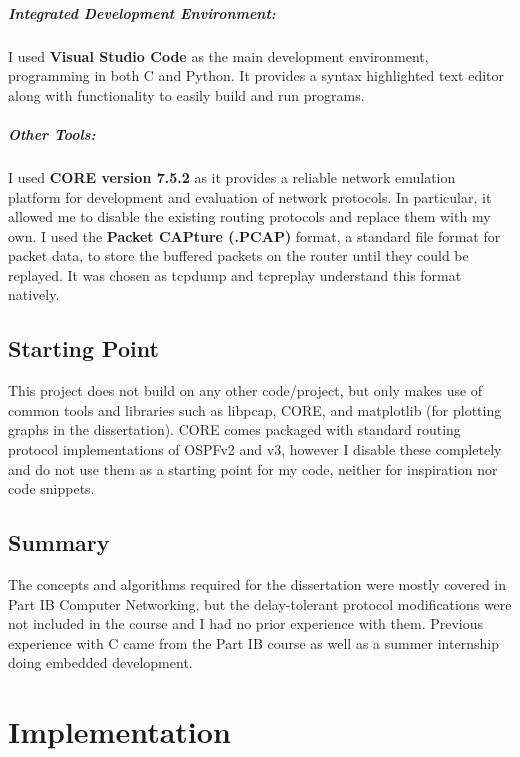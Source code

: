 \documentclass[withindex,glossary,openany]{cam-thesis}
\begin{document}
\paragraph{Integrated Development Environment:}

I used \textbf{Visual Studio Code} as the main development environment, programming in both C and Python. It provides a syntax highlighted text editor along with functionality to easily build and run programs.

\paragraph{Other Tools:}

I used \textbf{CORE version 7.5.2} as it provides a reliable network emulation platform for development and evaluation of network protocols. In particular, it allowed me to disable the existing routing protocols and replace them with my own. I used the \textbf{Packet CAPture (.PCAP)} format, a standard file format for packet data, to store the buffered packets on the router until they could be replayed. It was chosen as tcpdump and tcpreplay understand this format natively.


\section{Starting Point}

This project does not build on any other code/project, but only makes use of common tools and libraries such as libpcap, CORE, and matplotlib (for plotting graphs in the dissertation). CORE comes packaged with standard routing protocol implementations of OSPFv2 and v3, however I disable these completely and do not use them as a starting point for my code, neither for inspiration nor code snippets.

\section{Summary}

The concepts and algorithms required for the dissertation were mostly covered in Part IB Computer Networking, but the delay-tolerant protocol modifications were not included in the course and I had no prior experience with them. Previous experience with C came from the Part IB course as well as a summer internship doing embedded development.

\chapter{Implementation}
\end{document}
